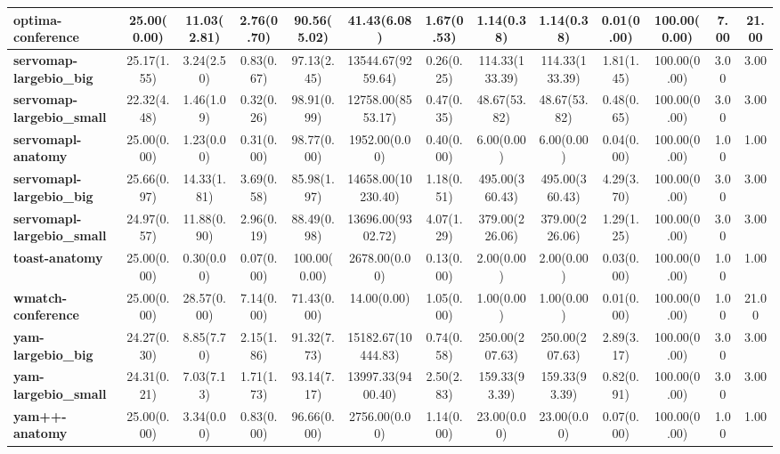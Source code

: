 \begin{tabular}{|l|c|c|c|c|c|c|c|c|c|c|c|c|}
\textbf{optima-conference}&25.00(0.00)&11.03(2.81)&2.76(0.70)&90.56(5.02)&41.43(6.08)&1.67(0.53)&1.14(0.38)&1.14(0.38)&0.01(0.00)&100.00(0.00)&7.00&21.00\\\hline
\textbf{servomap-largebio\_big}&25.17(1.55)&3.24(2.50)&0.83(0.67)&97.13(2.45)&13544.67(9259.64)&0.26(0.25)&114.33(133.39)&114.33(133.39)&1.81(1.45)&100.00(0.00)&3.00&3.00\\\hline
\textbf{servomap-largebio\_small}&22.32(4.48)&1.46(1.09)&0.32(0.26)&98.91(0.99)&12758.00(8553.17)&0.47(0.35)&48.67(53.82)&48.67(53.82)&0.48(0.65)&100.00(0.00)&3.00&3.00\\\hline
\textbf{servomapl-anatomy}&25.00(0.00)&1.23(0.00)&0.31(0.00)&98.77(0.00)&1952.00(0.00)&0.40(0.00)&6.00(0.00)&6.00(0.00)&0.04(0.00)&100.00(0.00)&1.00&1.00\\\hline
\textbf{servomapl-largebio\_big}&25.66(0.97)&14.33(1.81)&3.69(0.58)&85.98(1.97)&14658.00(10230.40)&1.18(0.51)&495.00(360.43)&495.00(360.43)&4.29(3.70)&100.00(0.00)&3.00&3.00\\\hline
\textbf{servomapl-largebio\_small}&24.97(0.57)&11.88(0.90)&2.96(0.19)&88.49(0.98)&13696.00(9302.72)&4.07(1.29)&379.00(226.06)&379.00(226.06)&1.29(1.25)&100.00(0.00)&3.00&3.00\\\hline
\textbf{toast-anatomy}&25.00(0.00)&0.30(0.00)&0.07(0.00)&100.00(0.00)&2678.00(0.00)&0.13(0.00)&2.00(0.00)&2.00(0.00)&0.03(0.00)&100.00(0.00)&1.00&1.00\\\hline
\textbf{wmatch-conference}&25.00(0.00)&28.57(0.00)&7.14(0.00)&71.43(0.00)&14.00(0.00)&1.05(0.00)&1.00(0.00)&1.00(0.00)&0.01(0.00)&100.00(0.00)&1.00&21.00\\\hline
\textbf{yam-largebio\_big}&24.27(0.30)&8.85(7.70)&2.15(1.86)&91.32(7.73)&15182.67(10444.83)&0.74(0.58)&250.00(207.63)&250.00(207.63)&2.89(3.17)&100.00(0.00)&3.00&3.00\\\hline
\textbf{yam-largebio\_small}&24.31(0.21)&7.03(7.13)&1.71(1.73)&93.14(7.17)&13997.33(9400.40)&2.50(2.83)&159.33(93.39)&159.33(93.39)&0.82(0.91)&100.00(0.00)&3.00&3.00\\\hline
\textbf{yam++-anatomy}&25.00(0.00)&3.34(0.00)&0.83(0.00)&96.66(0.00)&2756.00(0.00)&1.14(0.00)&23.00(0.00)&23.00(0.00)&0.07(0.00)&100.00(0.00)&1.00&1.00\\\hline
\end{tabular}
